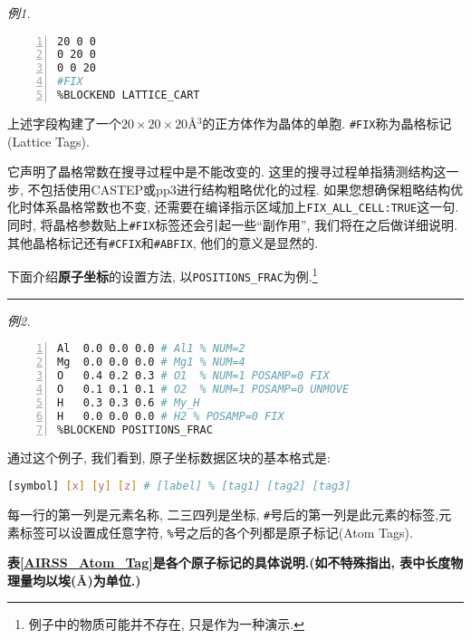 \documentclass[a4paper, 10pt]{article}
\begin{document}
        \emph{例1.}
        \begin{lstlisting}[language={bash},numbers=left]
%BLOCK LATTICE_CART
20 0 0
0 20 0
0 0 20
#FIX
%BLOCKEND LATTICE_CART
        \end{lstlisting}

        上述字段构建了一个\(20\times20\times20\)\r{A}\(^3\)的正方体作为晶体的单胞. \verb|#FIX|称为晶格标记(Lattice Tags). 
        
        它声明了晶格常数在搜寻过程中是不能改变的. 这里的搜寻过程单指猜测结构这一步, 不包括使用CASTEP或pp3进行结构粗略优化的过程. 如果您想确保粗略结构优化时体系晶格常数也不变, 还需要在编译指示区域加上\verb|FIX_ALL_CELL:TRUE|这一句. 同时, 将晶格参数贴上\verb|#FIX|标签还会引起一些``副作用'', 我们将在之后做详细说明. 其他晶格标记还有\verb|#CFIX|和\verb|#ABFIX|, 他们的意义是显然的.

        下面介绍\textbf{原子坐标}的设置方法, 以\verb|POSITIONS_FRAC|为例.\footnote{例子中的物质可能并不存在, 只是作为一种演示.}\\
        \noindent\rule{\textwidth}{0.3mm}

        \emph{例2.}
        \hypertarget{Aotic Package}{\ }
        \begin{lstlisting}[language={bash},numbers=left]
%BLOCK POSITIONS_FRAC
Al  0.0 0.0 0.0 # Al1 % NUM=2 
Mg  0.0 0.0 0.0 # Mg1 % NUM=4 
O   0.4 0.2 0.3 # O1  % NUM=1 POSAMP=0 FIX
O   0.1 0.1 0.1 # O2  % NUM=1 POSAMP=0 UNMOVE
H   0.3 0.3 0.6 # My_H 
H   0.0 0.0 0.0 # H2 % POSAMP=0 FIX
%BLOCKEND POSITIONS_FRAC
        \end{lstlisting}

        通过这个例子, 我们看到, 原子坐标数据区块的基本格式是:
        \begin{lstlisting}[language={bash}]
[symbol] [x] [y] [z] # [label] % [tag1] [tag2] [tag3]
        \end{lstlisting}

        每一行的第一列是元素名称, 二三四列是坐标, \verb|#|号后的第一列是此元素的标签,元素标签可以设置成任意字符, \verb|%|号之后的各个列都是原子标记(Atom Tags).
        
        \textbf{表\ref{AIRSS_Atom_Tag}是各个原子标记的具体说明.(如不特殊指出, 表中长度物理量均以埃(\r{A})为单位.)}
\end{document}
